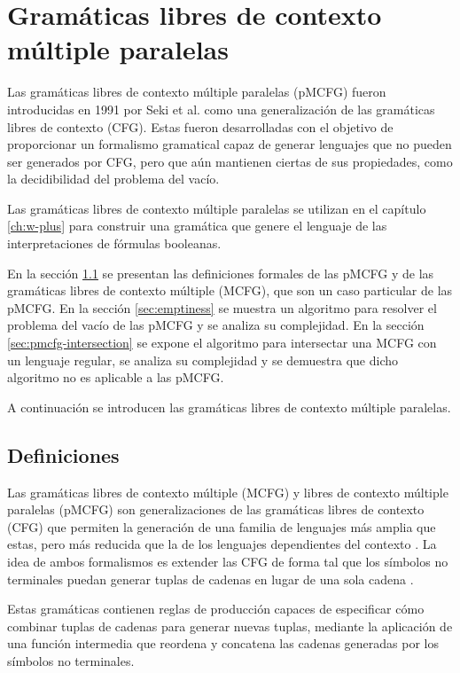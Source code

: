 \chapter{Gramáticas libres de contexto múltiple paralelas}
\label{ch:pmcfg}

Las gramáticas libres de contexto múltiple paralelas (pMCFG) \cite{Seki1991OnMC} fueron introducidas en 1991 por Seki et al. como una generalización de las gramáticas libres de contexto (CFG). Estas fueron desarrolladas con el objetivo de proporcionar un formalismo gramatical capaz de generar lenguajes que no pueden ser generados por CFG, pero que aún mantienen ciertas de sus propiedades, como la decidibilidad del problema del vacío.

Las gramáticas libres de contexto múltiple paralelas se utilizan en el capítulo \ref{ch:w-plus} para construir una gramática que genere el lenguaje de las interpretaciones de fórmulas booleanas.

En la sección \ref{sec:definitions} se presentan las definiciones formales de las pMCFG y de las gramáticas libres de contexto múltiple (MCFG), que son un caso particular de las pMCFG. En la sección \ref{sec:emptiness} se muestra un algoritmo para resolver el problema del vacío de las pMCFG y se analiza su complejidad. En la sección \ref{sec:pmcfg-intersection} se expone el algoritmo para intersectar una MCFG con un lenguaje regular, se analiza su complejidad y se demuestra que dicho algoritmo no es aplicable a las pMCFG.

A continuación se introducen las gramáticas libres de contexto múltiple paralelas.

\section{Definiciones}
\label{sec:definitions}

Las gramáticas libres de contexto múltiple (MCFG) y libres de contexto múltiple paralelas (pMCFG) son generalizaciones de las gramáticas libres de contexto (CFG) que permiten la generación de una familia de lenguajes más amplia que estas, pero más reducida que la de los lenguajes dependientes del contexto \cite{Seki1991OnMC}. La idea de ambos formalismos es extender las CFG de forma tal que los símbolos no terminales puedan generar tuplas de cadenas en lugar de una sola cadena \cite{Seki1991OnMC}.

Estas gramáticas contienen reglas de producción capaces de especificar cómo combinar tuplas de cadenas para generar nuevas tuplas, mediante la aplicación de una función intermedia que reordena y concatena las cadenas generadas por los símbolos no terminales.


